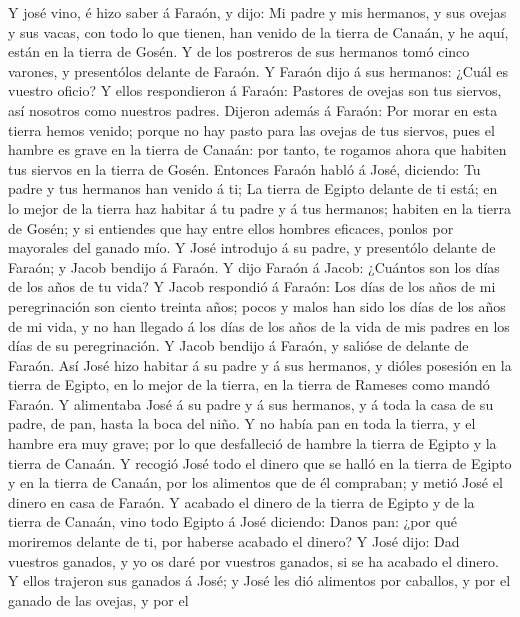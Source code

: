  Y josé vino, é hizo saber á Faraón, y dijo: Mi padre y mis
hermanos, y sus ovejas y sus vacas, con todo lo que tienen, han venido
de la tierra de Canaán, y he aquí, están en la tierra de Gosén.
 Y de los postreros de sus hermanos tomó cinco varones, y
presentólos delante de Faraón.  Y Faraón dijo á sus
hermanos: ¿Cuál es vuestro oficio? Y ellos respondieron á Faraón:
Pastores de ovejas son tus siervos, así nosotros como nuestros padres.
 Dijeron además á Faraón: Por morar en esta tierra hemos
venido; porque no hay pasto para las ovejas de tus siervos, pues el
hambre es grave en la tierra de Canaán: por tanto, te rogamos ahora que
habiten tus siervos en la tierra de Gosén.  Entonces Faraón
habló á José, diciendo: Tu padre y tus hermanos han venido á ti;
 La tierra de Egipto delante de ti está; en lo mejor de la
tierra haz habitar á tu padre y á tus hermanos; habiten en la tierra de
Gosén; y si entiendes que hay entre ellos hombres eficaces, ponlos por
mayorales del ganado mío.  Y José introdujo á su padre, y
presentólo delante de Faraón; y Jacob bendijo á Faraón.  Y
dijo Faraón á Jacob: ¿Cuántos son los días de los años de tu vida?
 Y Jacob respondió á Faraón: Los días de los años de mi
peregrinación son ciento treinta años; pocos y malos han sido los días
de los años de mi vida, y no han llegado á los días de los años de la
vida de mis padres en los días de su peregrinación.  Y
Jacob bendijo á Faraón, y salióse de delante de Faraón. 
Así José hizo habitar á su padre y á sus hermanos, y dióles posesión en
la tierra de Egipto, en lo mejor de la tierra, en la tierra de Rameses
como mandó Faraón.  Y alimentaba José á su padre y á sus
hermanos, y á toda la casa de su padre, de pan, hasta la boca del niño.
 Y no había pan en toda la tierra, y el hambre era muy
grave; por lo que desfalleció de hambre la tierra de Egipto y la tierra
de Canaán.  Y recogió José todo el dinero que se halló en
la tierra de Egipto y en la tierra de Canaán, por los alimentos que de
él compraban; y metió José el dinero en casa de Faraón.  Y
acabado el dinero de la tierra de Egipto y de la tierra de Canaán, vino
todo Egipto á José diciendo: Danos pan: ¿por qué moriremos delante de
ti, por haberse acabado el dinero?  Y José dijo: Dad
vuestros ganados, y yo os daré por vuestros ganados, si se ha acabado el
dinero.  Y ellos trajeron sus ganados á José; y José les
dió alimentos por caballos, y por el ganado de las ovejas, y por el
